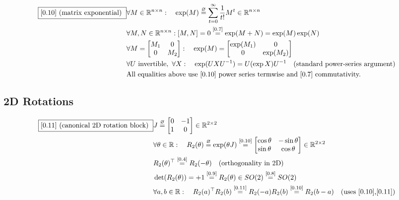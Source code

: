 \documentclass[11pt]{article}
\newcommand{\eqdef}{\overset{\varnothing}{=}}
\newcommand{\eqref}[1]{\overset{[#1]}{=}}
\begin{document}
\begin{align}
\boxed{[0.10] \text{ (matrix exponential) }}
&\forall M \in \mathbb{R}^{n\times n}:\quad
\exp(M)
\eqdef
\sum_{t=0}^{\infty}
\frac{1}{t!} M^t
\in \mathbb{R}^{n\times n} \notag\\
&\forall M,N \in \mathbb{R}^{n\times n}:
[M,N]=0
\eqref{0.7}
\exp(M+N)
=
\exp(M)\exp(N) \notag\\
&\forall
M=
\begin{bmatrix}
M_1 & 0\\
0 & M_2
\end{bmatrix}
:\quad
\exp(M)
=
\begin{bmatrix}
\exp(M_1) & 0\\
0 & \exp(M_2)
\end{bmatrix} \notag\\
&\forall U \text{ invertible},\ \forall X:\quad
\exp(U X U^{-1})
=
U (\exp X) U^{-1}
\quad(\text{standard power-series argument}) \notag\\
&\text{All equalities above use [0.10] power series termwise and [0.7] commutativity.}
\end{align}

\subsection{2D Rotations}

\begin{align}
\boxed{[0.11] \text{ (canonical 2D rotation block) }}
&J
\eqdef
\begin{bmatrix}
0 & -1\\
1 & 0
\end{bmatrix}
\in \mathbb{R}^{2\times 2} \notag\\
&\forall\theta\in\mathbb{R}:\quad
R_2(\theta)
\eqdef
\exp(\theta J)
\eqref{0.10}
\begin{bmatrix}
\cos\theta & -\sin\theta\\
\sin\theta & \cos\theta
\end{bmatrix}
\in \mathbb{R}^{2\times 2} \notag\\
&R_2(\theta)^\top
\eqref{0.4}
R_2(-\theta)
\quad(\text{orthogonality in 2D}) \notag\\
&\det(R_2(\theta))
=
+1
\eqref{0.9}
R_2(\theta)
\in SO(2)
\eqref{0.8}
SO(2) \notag\\
&\forall a,b\in\mathbb{R}:\quad
R_2(a)^\top R_2(b)
\eqref{0.11}
R_2(-a)R_2(b)
\eqref{0.10}
R_2(b-a)
\quad(\text{uses [0.10],[0.11]})
\end{align}
\end{document}

